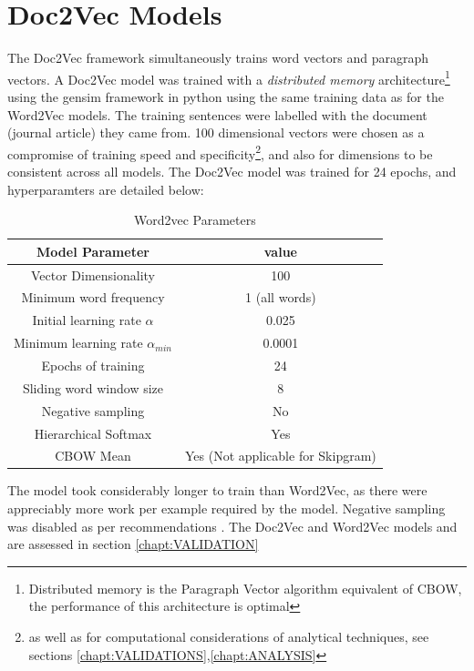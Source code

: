 \section{Doc2Vec Models}
The Doc2Vec framework simultaneously trains word vectors and paragraph vectors. A Doc2Vec model was trained with a \emph{distributed memory} architecture\footnote{Distributed memory is the Paragraph Vector algorithm equivalent of CBOW, the performance of this architecture is optimal\cite{doc2vec}} using the gensim framework in python \cite{gensim} using the same training data as for the Word2Vec models. The training sentences were labelled with the document (journal article) they came from. 100 dimensional vectors were chosen as a compromise of training speed and specificity\footnote{as well as for computational considerations of analytical techniques, see sections \ref{chapt:VALIDATIONS},\ref{chapt:ANALYSIS}}, and also for dimensions to be consistent across all models. The Doc2Vec model was trained for 24 epochs, and hyperparamters are detailed below:
\begin{table}[h!]
\begin{center}
\label{tab:hyperparams}
\caption{Word2vec Parameters}
\begin{tabular}{||c|c||}
\hline
Model Parameter & value\\
\hline
Vector Dimensionality & 100\\
Minimum word frequency & 1 (all words)\\
Initial learning rate $\alpha$ & 0.025 \\
Minimum learning rate $\alpha_{min}$&0.0001\\
Epochs of training & 24\\
Sliding word window size & 8\\
Negative sampling & No \\
Hierarchical Softmax & Yes\\
CBOW Mean & Yes (Not applicable for Skipgram) \\
\hline
\end{tabular}
\end{center}
\end{table}
The model took considerably longer to train than Word2Vec, as there were appreciably more work per example required by the model. Negative sampling was disabled as per recommendations \cite{gensim} \cite{doc2vec}.
The Doc2Vec and Word2Vec models and are assessed in section \ref{chapt:VALIDATION}
